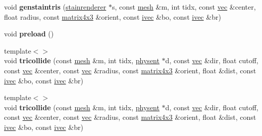 \begin{DoxyCompactItemize}
\mbox{\label{struct_b_i_h_a2038d591a806f7a5e32975d8707a94ab}} 
void {\bfseries genstaintris} (\hyperlink{structstainrenderer}{stainrenderer} $\ast$s, const \hyperlink{struct_b_i_h_1_1mesh}{mesh} \&m, int tidx, const \hyperlink{structvec}{vec} \&center, float radius, const \hyperlink{structmatrix4x3}{matrix4x3} \&orient, const \hyperlink{structivec}{ivec} \&bo, const \hyperlink{structivec}{ivec} \&br)
\item 
\mbox{\label{struct_b_i_h_ab4509d45d115644cb8377436ba1d6be1}} 
void {\bfseries preload} ()
\item 
\mbox{\label{struct_b_i_h_a7847cf9ec6ac5fc60e5b12024e4a77c9}} 
{\footnotesize template$<$$>$ }\\void {\bfseries tricollide} (const \hyperlink{struct_b_i_h_1_1mesh}{mesh} \&m, int tidx, \hyperlink{structphysent}{physent} $\ast$d, const \hyperlink{structvec}{vec} \&dir, float cutoff, const \hyperlink{structvec}{vec} \&center, const \hyperlink{structvec}{vec} \&radius, const \hyperlink{structmatrix4x3}{matrix4x3} \&orient, float \&dist, const \hyperlink{structivec}{ivec} \&bo, const \hyperlink{structivec}{ivec} \&br)
\item 
\mbox{\label{struct_b_i_h_a7847cf9ec6ac5fc60e5b12024e4a77c9}} 
{\footnotesize template$<$$>$ }\\void {\bfseries tricollide} (const \hyperlink{struct_b_i_h_1_1mesh}{mesh} \&m, int tidx, \hyperlink{structphysent}{physent} $\ast$d, const \hyperlink{structvec}{vec} \&dir, float cutoff, const \hyperlink{structvec}{vec} \&center, const \hyperlink{structvec}{vec} \&radius, const \hyperlink{structmatrix4x3}{matrix4x3} \&orient, float \&dist, const \hyperlink{structivec}{ivec} \&bo, const \hyperlink{structivec}{ivec} \&br)
\end{DoxyCompactItemize}
